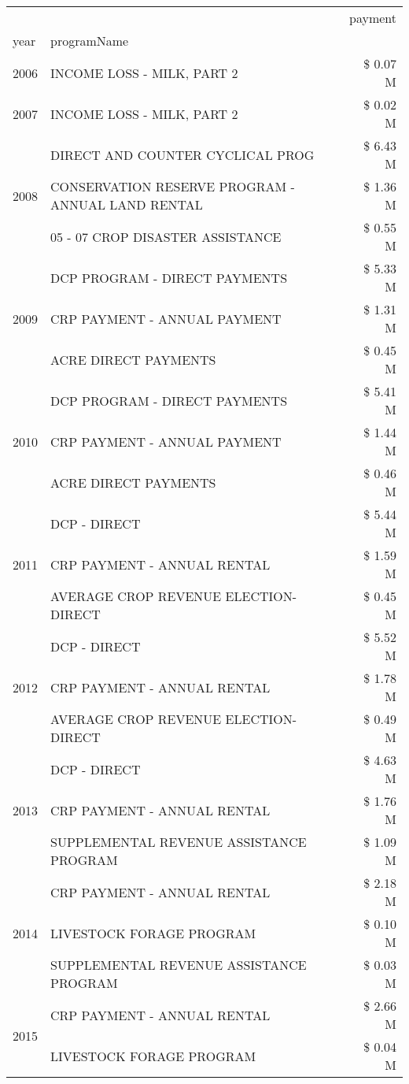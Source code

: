 \begin{tabular}{llr}
\toprule
 &  & payment \\
year & programName &  \\
\midrule
2006 & INCOME LOSS - MILK, PART 2 & \$ 0.07 M \\
\cline{1-3}
2007 & INCOME LOSS - MILK, PART 2 & \$ 0.02 M \\
\cline{1-3}
\multirow[t]{3}{*}{2008} & DIRECT AND COUNTER CYCLICAL PROG & \$ 6.43 M \\
 & CONSERVATION RESERVE PROGRAM - ANNUAL LAND RENTAL & \$ 1.36 M \\
 & 05 - 07 CROP DISASTER ASSISTANCE & \$ 0.55 M \\
\cline{1-3}
\multirow[t]{3}{*}{2009} & DCP PROGRAM - DIRECT PAYMENTS & \$ 5.33 M \\
 & CRP PAYMENT - ANNUAL PAYMENT & \$ 1.31 M \\
 & ACRE DIRECT PAYMENTS & \$ 0.45 M \\
\cline{1-3}
\multirow[t]{3}{*}{2010} & DCP PROGRAM - DIRECT PAYMENTS & \$ 5.41 M \\
 & CRP PAYMENT - ANNUAL PAYMENT & \$ 1.44 M \\
 & ACRE DIRECT PAYMENTS & \$ 0.46 M \\
\cline{1-3}
\multirow[t]{3}{*}{2011} & DCP - DIRECT & \$ 5.44 M \\
 & CRP PAYMENT - ANNUAL RENTAL & \$ 1.59 M \\
 & AVERAGE CROP REVENUE ELECTION-DIRECT & \$ 0.45 M \\
\cline{1-3}
\multirow[t]{3}{*}{2012} & DCP - DIRECT & \$ 5.52 M \\
 & CRP PAYMENT - ANNUAL RENTAL & \$ 1.78 M \\
 & AVERAGE CROP REVENUE ELECTION-DIRECT & \$ 0.49 M \\
\cline{1-3}
\multirow[t]{3}{*}{2013} & DCP - DIRECT & \$ 4.63 M \\
 & CRP PAYMENT - ANNUAL RENTAL & \$ 1.76 M \\
 & SUPPLEMENTAL REVENUE ASSISTANCE PROGRAM & \$ 1.09 M \\
\cline{1-3}
\multirow[t]{3}{*}{2014} & CRP PAYMENT - ANNUAL RENTAL & \$ 2.18 M \\
 & LIVESTOCK FORAGE PROGRAM & \$ 0.10 M \\
 & SUPPLEMENTAL REVENUE ASSISTANCE PROGRAM & \$ 0.03 M \\
\cline{1-3}
\multirow[t]{3}{*}{2015} & CRP PAYMENT - ANNUAL RENTAL & \$ 2.66 M \\
 & LIVESTOCK FORAGE PROGRAM & \$ 0.04 M \\

\end{tabular}

